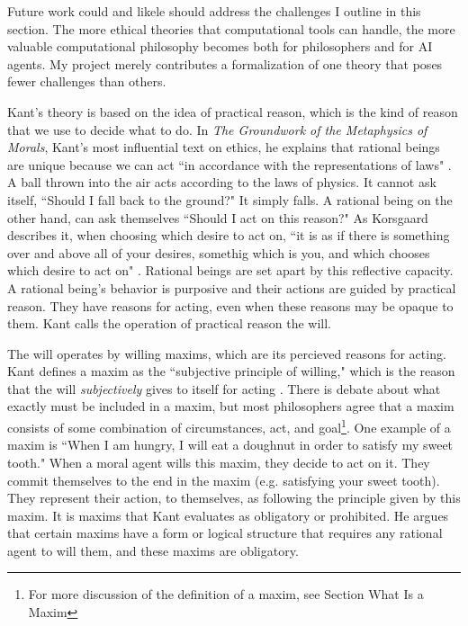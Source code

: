 \begin{isabellebody}
\begin{isamarkuptext}
Future work could and likele should address the challenges I outline in this section. The more ethical
theories that computational tools can handle, the more valuable computational philosophy becomes
both for philosophers and for AI agents. My project merely contributes a formalization of one theory that 
poses fewer challenges than others.%
\end{isamarkuptext}\isamarkuptrue%
%
\isadelimdocument
%
\endisadelimdocument
%
\isatagdocument
%
\isamarkuptrue%
%
\isamarkuptrue%
%
\endisatagdocument
{\isafolddocument}%
%
\isadelimdocument
%
\endisadelimdocument
%
\begin{isamarkuptext}%
Kant's theory is based on the idea of practical reason, which is the kind of reason that we 
use to decide what to do. In \emph{The Groundwork of the Metaphysics of Morals}, Kant's most influential 
text on ethics, he explains that rational beings are unique because we can act ``in accordance with 
the representations of laws" \cite[4:412]{groundwork}. A ball thrown into the air acts according to 
the laws of physics. It cannot ask itself, ``Should I fall back to the ground?" It simply falls. 
A rational being on the other hand, can ask themselves ``Should I act on this reason?" As Korsgaard describes it, when 
choosing which desire to act on, ``it is as if there is something over and above all of your desires, 
somethig which is you, and which chooses which desire to act on" \cite[100]{sources}. Rational beings are
set apart by this reflective capacity. A rational being's behavior is purposive and their 
actions are guided by practical reason. They have reasons for acting, even when these reasons may be 
opaque to them. Kant calls the operation of practical reason the will. 

The will operates by willing maxims, which are its percieved reasons for acting. Kant defines a maxim as 
the ``subjective principle of willing," which is the reason that the will \emph{subjectively} gives 
to itself for acting \cite[16, footnote 1]{groundwork}. There is debate about what exactly must be 
included in a maxim, but most philosophers agree that a maxim consists of some combination of circumstances, 
act, and goal\footnote{For more discussion of the definition of a maxim, see Section What Is a Maxim}.
One example of a maxim is ``When I am hungry, I will eat a doughnut in order to satisfy my sweet tooth." 
When a moral agent wills this maxim, they decide to act on it. They commit themselves to the end in the maxim 
(e.g. satisfying your sweet tooth). They represent their action, to themselves, as following the 
principle given by this maxim. It is maxims that Kant evaluates as obligatory or prohibited. He argues that
certain maxims have a form or logical structure that requires any rational agent to will them, and these
maxims are obligatory. 


\end{isamarkuptext}
\end{isabellebody}
